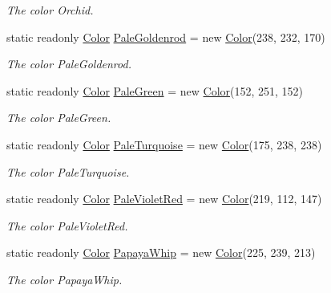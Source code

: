 \begin{DoxyCompactItemize}
\begin{DoxyCompactList}\small\item\em The color Orchid. \end{DoxyCompactList}\item 
static readonly \hyperlink{struct_tri_devs_1_1_tri_engine2_d_1_1_color}{Color} \hyperlink{struct_tri_devs_1_1_tri_engine2_d_1_1_color_aca1543ce244357bae5c677b047212226}{Pale\-Goldenrod} = new \hyperlink{struct_tri_devs_1_1_tri_engine2_d_1_1_color}{Color}(238, 232, 170)
\begin{DoxyCompactList}\small\item\em The color Pale\-Goldenrod. \end{DoxyCompactList}\item 
static readonly \hyperlink{struct_tri_devs_1_1_tri_engine2_d_1_1_color}{Color} \hyperlink{struct_tri_devs_1_1_tri_engine2_d_1_1_color_a31ee964afbf9fae6036dca9b519acd6e}{Pale\-Green} = new \hyperlink{struct_tri_devs_1_1_tri_engine2_d_1_1_color}{Color}(152, 251, 152)
\begin{DoxyCompactList}\small\item\em The color Pale\-Green. \end{DoxyCompactList}\item 
static readonly \hyperlink{struct_tri_devs_1_1_tri_engine2_d_1_1_color}{Color} \hyperlink{struct_tri_devs_1_1_tri_engine2_d_1_1_color_a236d865062f8734a0f87bfee844af9f6}{Pale\-Turquoise} = new \hyperlink{struct_tri_devs_1_1_tri_engine2_d_1_1_color}{Color}(175, 238, 238)
\begin{DoxyCompactList}\small\item\em The color Pale\-Turquoise. \end{DoxyCompactList}\item 
static readonly \hyperlink{struct_tri_devs_1_1_tri_engine2_d_1_1_color}{Color} \hyperlink{struct_tri_devs_1_1_tri_engine2_d_1_1_color_a92982d46cc16cdeee62113b3c7974f3c}{Pale\-Violet\-Red} = new \hyperlink{struct_tri_devs_1_1_tri_engine2_d_1_1_color}{Color}(219, 112, 147)
\begin{DoxyCompactList}\small\item\em The color Pale\-Violet\-Red. \end{DoxyCompactList}\item 
static readonly \hyperlink{struct_tri_devs_1_1_tri_engine2_d_1_1_color}{Color} \hyperlink{struct_tri_devs_1_1_tri_engine2_d_1_1_color_ac477a628c53a2f8db0c6616753ba2079}{Papaya\-Whip} = new \hyperlink{struct_tri_devs_1_1_tri_engine2_d_1_1_color}{Color}(225, 239, 213)
\begin{DoxyCompactList}\small\item\em The color Papaya\-Whip. \end{DoxyCompactList}\item 

\end{DoxyCompactItemize}
